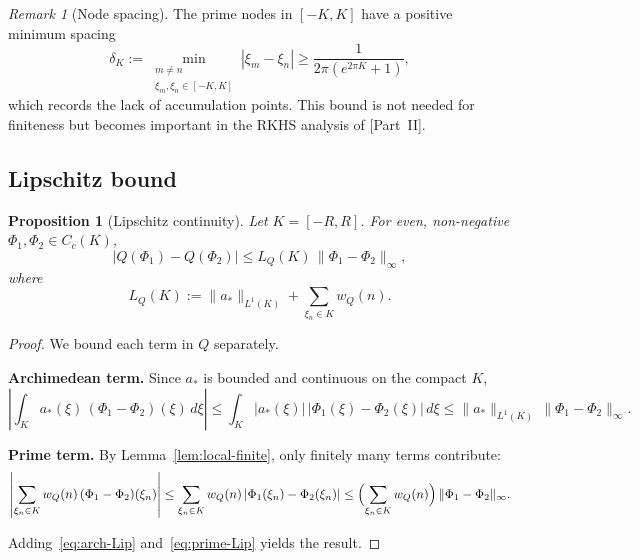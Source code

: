 \documentclass[11pt,a4paper]{article}
\newtheorem{proposition}[theorem]{Proposition}
\theoremstyle{definition}
\theoremstyle{remark}
\newtheorem{remark}[theorem]{Remark}
\begin{document}
\begin{remark}[Node spacing]\label{rem:spacing}
The prime nodes in $[-K, K]$ have a positive minimum spacing
\begin{equation}\label{eq:delta}
  \delta_K := \min_{\substack{m \neq n \\ \xi_m, \xi_n \in [-K,K]}} |\xi_m - \xi_n|
  \geq \frac{1}{2\pi(e^{2\pi K} + 1)},
\end{equation}
which records the lack of accumulation points. This bound is not needed for finiteness but becomes important in the RKHS analysis of [Part~II].
\end{remark}

\subsection{Lipschitz bound}

\begin{proposition}[Lipschitz continuity]\label{prop:Lip}
Let $K = [-R, R]$. For even, non-negative $\Phi_1, \Phi_2 \in C_c(K)$,
\begin{equation}\label{eq:Lip-bound}
  |Q(\Phi_1) - Q(\Phi_2)| \leq L_Q(K)\, \|\Phi_1 - \Phi_2\|_\infty,
\end{equation}
where
\begin{equation}\label{eq:LQ-def}
  L_Q(K) := \|a_*\|_{L^1(K)} + \sum_{\xi_n \in K} w_Q(n).
\end{equation}
\end{proposition}

\begin{proof}
We bound each term in $Q$ separately.

\textbf{Archimedean term.} Since $a_*$ is bounded and continuous on the compact $K$,
\begin{equation}\label{eq:arch-Lip}
  \left|\int_K a_*(\xi)\, (\Phi_1 - \Phi_2)(\xi)\, d\xi\right|
  \leq \int_K |a_*(\xi)|\, |\Phi_1(\xi) - \Phi_2(\xi)|\, d\xi
  \leq \|a_*\|_{L^1(K)}\, \|\Phi_1 - \Phi_2\|_\infty.
\end{equation}

\textbf{Prime term.} By Lemma~\ref{lem:local-finite}, only finitely many terms contribute:
\begin{equation}\label{eq:prime-Lip}
  \left|\sum_{\xi_n \in K} w_Q(n)\, (\Phi_1 - \Phi_2)(\xi_n)\right|
  \leq \sum_{\xi_n \in K} w_Q(n)\, |\Phi_1(\xi_n) - \Phi_2(\xi_n)|
  \leq \Bigl(\sum_{\xi_n \in K} w_Q(n)\Bigr)\, \|\Phi_1 - \Phi_2\|_\infty.
\end{equation}

Adding~\eqref{eq:arch-Lip} and~\eqref{eq:prime-Lip} yields the result.
\end{proof}
\end{document}
